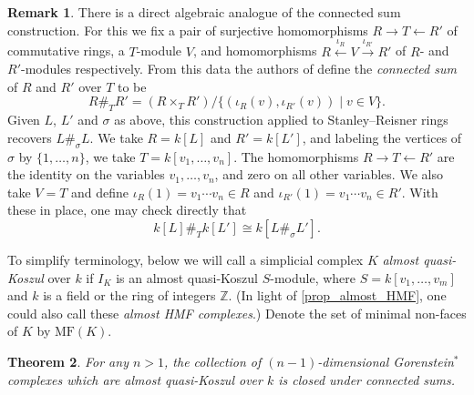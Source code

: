 \documentclass[a4paper,10pt]{amsart}
\newtheorem{theorem}{Theorem}[section]
\theoremstyle{definition}
\newtheorem{remark}[theorem]{Remark}
\theoremstyle{remark}
\begin{document}
\begin{remark}
    There is a direct algebraic analogue of the connected sum construction. For this we fix a pair of surjective homomorphisms $R\to T\leftarrow R'$ of commutative rings, a $T$-module $V$, and homomorphisms $R\xleftarrow{\iota_R} V\xrightarrow{\iota_{R'}} R'$ of $R$- and $R'$-modules respectively.  From this data the authors of \cite{AAM} define the \emph{connected sum} of $R$ and $R'$ over $T$ to be
    \[
    R\#_TR'=\left(R\times_TR'\right)/\big\{ (\iota_{R}(v),\iota_{R'}(v))\mid v\in V\big\}.
    \]
    Given $L$, $L'$ and $\sigma$ as above, this construction applied to Stanley--Reisner rings recovers $L\#_\sigma L$. We take $R=k[L]$ and $R'=k[L']$, and labeling the vertices of $\sigma$ by $\{1,\ldots,n\}$, we take $T=k[v_1,\ldots,v_n]$. The homomorphisms $R\to T\leftarrow R'$ are the identity on the variables $v_1,\ldots,v_n$, and zero on all other variables. We also take $V=T$ and define $\iota_R(1)=v_1\cdots v_n\in R$ and $\iota_{R'}(1)=v_1\cdots v_n\in R'$. With these in place, one may check directly that
    \[
    k[L]\#_Tk[L']\cong k[L\#_\sigma L'].
    \]
\end{remark}

To simplify terminology, below we will call a simplicial complex $K$ \emph{almost quasi-Koszul} over $k$ if $I_K$ is an almost quasi-Koszul $S$-module, where $S=k[v_1,\ldots,v_m]$ and $k$ is a field or the ring of integers $\mathbb{Z}$. (In light of \cref{prop_almost_HMF}, one could also call these \emph{almost HMF complexes}.) Denote the set of minimal non-faces of $K$ by $\mathrm{MF}(K)$.

\begin{theorem} \label{thm_closed_under_sums}
For any $n>1$, the collection of $(n-1)$-dimensional Gorenstein$^*$ complexes which are almost quasi-Koszul over $k$ is closed under connected sums. 
\end{theorem}
\end{document}
